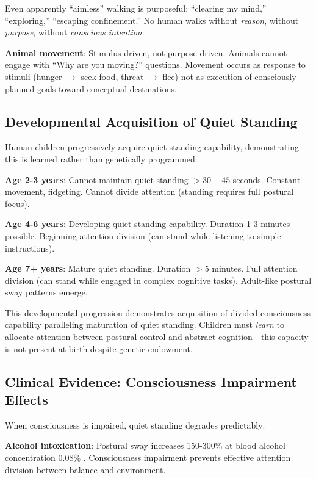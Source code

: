 \documentclass[12pt,a4paper]{article}
\begin{document}
Even apparently ``aimless'' walking is purposeful: ``clearing my mind,'' ``exploring,'' ``escaping confinement.'' No human walks without \textit{reason}, without \textit{purpose}, without \textit{conscious intention}.

\textbf{Animal movement}: Stimulus-driven, not purpose-driven. Animals cannot engage with ``Why are you moving?'' questions. Movement occurs as response to stimuli (hunger $\rightarrow$ seek food, threat $\rightarrow$ flee) not as execution of consciously-planned goals toward conceptual destinations.

\subsection{Developmental Acquisition of Quiet Standing}

Human children progressively acquire quiet standing capability, demonstrating this is learned rather than genetically programmed:

\textbf{Age 2-3 years}: Cannot maintain quiet standing $>30-45$ seconds. Constant movement, fidgeting. Cannot divide attention (standing requires full postural focus).

\textbf{Age 4-6 years}: Developing quiet standing capability. Duration 1-3 minutes possible. Beginning attention division (can stand while listening to simple instructions).

\textbf{Age 7+ years}: Mature quiet standing. Duration $>5$ minutes. Full attention division (can stand while engaged in complex cognitive tasks). Adult-like postural sway patterns emerge.

This developmental progression demonstrates acquisition of divided consciousness capability paralleling maturation of quiet standing. Children must \textit{learn} to allocate attention between postural control and abstract cognition—this capacity is not present at birth despite genetic endowment.

\subsection{Clinical Evidence: Consciousness Impairment Effects}

When consciousness is impaired, quiet standing degrades predictably:

\textbf{Alcohol intoxication}: Postural sway increases 150-300\% at blood alcohol concentration 0.08\% \citep{deviterne1998alcohol}. Consciousness impairment prevents effective attention division between balance and environment.
\end{document}
